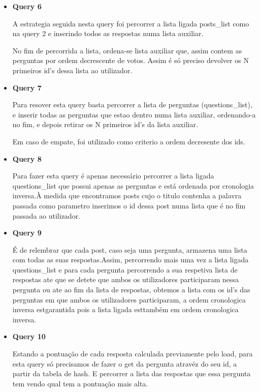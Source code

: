 \documentclass[a4paper,10pt]{article}
\begin{document}
\begin{itemize}
  \item \textbf{Query 6}
    
    \quad\quad A estrategia seguida nesta query foi percorrer a lista ligada posts\_list como na query 2 e inserindo todos as respostas numa lista auxiliar.

    \quad\quad No fim de percorrida a lista, ordena-se lista auxiliar que, assim contem as perguntas por ordem decrescente de votos. Assim \'e s\'o preciso devolver os N primeiros id's dessa lista ao utilizador.
    
  \item \textbf{Query 7}
    
    \quad\quad Para resover esta query basta percorrer a lista de perguntas (questions\_list), e inserir todas as perguntas que estao dentro numa lista auxiliar, ordenando-a no fim, e depois retirar os N primeiros id's da lista auxiliar.

    \quad\quad Em caso de empate, foi utilizado como criterio a ordem decresente dos ids.
  
  \item \textbf{Query 8}
    
    \quad\quad Para fazer esta query \'e apenas necess\'ario percorrer a lista ligada questions\_list que possui apenas as perguntas e est\'a ordenada por cronologia inversa.\`A medida que encontramos posts cujo o titulo contenha a palavra passada como parametro inserimos o id dessa post numa lista que \'e no fim passada ao utilizador.
    
  \item \textbf{Query 9}
    
    \quad\quad \'E de relembrar que cada post, caso seja uma pergunta, armazena uma lista com todas as suas respostas.Assim, percorrendo mais uma vez a lista ligada questions\_list e para cada pergunta percorrendo a sua respetiva lista de respostas ate que se detete que ambos os utilizadores participaram nessa pergunta ou ate ao fim da lista de respostas, obtemos a lista com os id's das perguntas em que ambos os utilizadores participaram, a ordem cronologica inversa est\á garantida pois a lista ligada est\á tamb\'em em ordem cronologica inversa.
    
  \item \textbf{Query 10}
    
    \quad\quad Estando a pontua\c{c}\~ao de cada resposta calculada previamente pelo load, para esta query s\'o precisamos de fazer o get da pergunta atrav\'ez do seu id, a partir da tabela de hash. E percorrer a lista das respostas que essa pergunta tem vendo qual tem a pontua\c{c}\~ao mais alta.
    

\end{itemize}
\end{document}
